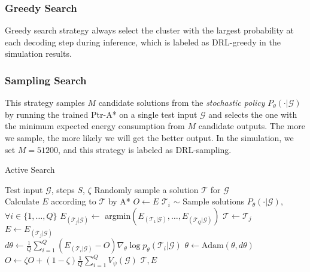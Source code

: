 \documentclass[journal]{IEEEtran}
\begin{document}
\subsubsection{Greedy Search}
Greedy search strategy always select the cluster with the largest probability at each decoding step during inference, which is labeled as DRL-greedy in the simulation results.

\subsubsection{Sampling Search}
This strategy samples $M$ candidate solutions from the \emph{stochastic policy} $ P_\theta(\cdot|\bm{\mathcal{G}})$ by running the trained Ptr-A* on a single test input $\bm{\mathcal{G}}$ and selects the one with the minimum expected energy consumption from $M$ candidate outputs. The more we sample, the more likely we will get the better output. In the simulation, we set $M = 51200$, and this strategy is labeled as DRL-sampling.

\begin{algorithm}[t!]
	\caption{Active Search}
	\label{active}
	\begin{algorithmic}[1]
		\renewcommand{\algorithmicrequire}{\textbf{Input:}}
	     \REQUIRE Test input $\bm{\mathcal{G}}$, steps $S$, $\zeta$
	    \STATE Randomly sample a solution $\bm{\mathcal{T}}$ for $\bm{\mathcal{G}}$\\
	    \STATE Calculate $E$ according to $\bm{\mathcal{T}}$ by A*
	    \STATE $O \gets E$
		\STATE  $\bm{\mathcal{T}}_i$ $\sim$ Sample solutions $P_{\theta}(\cdot|\bm{\mathcal{G}})$, $\forall{i}\in\{1,\dots, Q\}$
		\STATE  $E_{(\bm{\mathcal{T}}_j|\bm{\mathcal{G}})}\gets$ argmin$\left(E_{(\bm{\mathcal{T}}_1|\bm{\mathcal{G}})}, \dots, E_{(\bm{\mathcal{T}}_Q|\bm{\mathcal{G}})} \right)$
		  \STATE $\bm{\mathcal{T}} \gets \bm{\mathcal{T}}_j$\\
		  \STATE $E \gets E_{(\bm{\mathcal{T}}_j|\bm{\mathcal{G}})}$\\
		\ENDIF
		\STATE $d\theta \gets \frac{1}{Q} \sum_{i=1}^Q \left( E_{(\bm{\mathcal{T}}_i|\bm{\mathcal{G}})}-O \right) \nabla_{\theta} \log p_{\theta} \left(\bm{\mathcal{T}}_i|\bm{\mathcal{G}}\right)$
		\STATE $\theta \gets \text{Adam}\left(\theta, d\theta\right)$
		\STATE $O \gets \zeta O + (1-\zeta) \frac{1}{Q}\sum_{i=1}^Q V_{\psi}\left(\bm{\mathcal{G}}\right)$
		\ENDFOR
		\RETURN $\bm{\mathcal{T}}, E$
	\end{algorithmic}
\end{algorithm}
\end{document}
